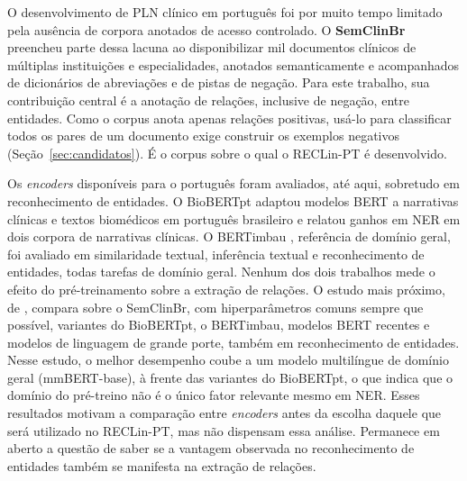 O desenvolvimento de PLN clínico em português foi por muito tempo limitado pela
ausência de corpora anotados de acesso controlado. O \textbf{SemClinBr}
\cite{oliveira_2022_semclinbr} preencheu parte dessa lacuna ao disponibilizar mil
documentos clínicos de múltiplas instituições e especialidades, anotados
semanticamente e acompanhados de dicionários de abreviações e de pistas de negação.
Para este trabalho, sua contribuição central é a anotação de relações, inclusive de
negação, entre entidades. Como o corpus anota apenas relações positivas, usá-lo para
classificar todos os pares de um documento exige construir os exemplos negativos
(Seção~\ref{sec:candidatos}). É o corpus sobre o qual o RECLin-PT é desenvolvido.

Os \emph{encoders} disponíveis para o português foram avaliados, até aqui, sobretudo
em reconhecimento de entidades. O BioBERTpt \cite{schneider_2020_biobertpt}
adaptou modelos BERT a narrativas clínicas e textos biomédicos em português
brasileiro e relatou ganhos em NER em dois corpora de narrativas clínicas. O
BERTimbau \cite{souza_2020_bertimbau}, referência de domínio geral, foi avaliado em
similaridade textual, inferência textual e reconhecimento de entidades, todas tarefas
de domínio geral. Nenhum dos dois trabalhos mede o efeito do pré-treinamento sobre a
extração de relações. O estudo mais próximo, de ,
compara sobre o SemClinBr, com hiperparâmetros comuns sempre que possível, variantes
do BioBERTpt, o BERTimbau, modelos BERT recentes e modelos de linguagem de grande
porte, também em reconhecimento de entidades. Nesse estudo, o melhor desempenho
coube a um modelo multilíngue de domínio geral (mmBERT-base), à frente das variantes
do BioBERTpt, o que indica que o domínio do pré-treino não é o único fator relevante
mesmo em NER. Esses resultados motivam a comparação entre \emph{encoders} antes da escolha daquele que será utilizado no RECLin-PT, mas não dispensam essa análise. Permanece em aberto a questão de saber se a vantagem observada no reconhecimento de entidades também se manifesta na extração de relações.

